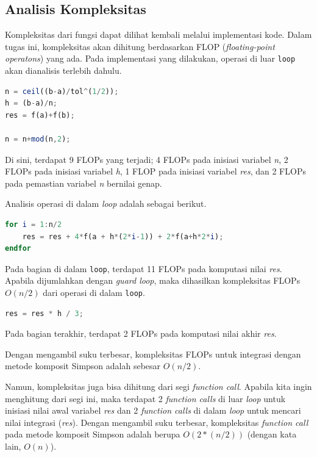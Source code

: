 \documentclass[journal,12pt,onecolumn,a4paper]{IEEEtran}
\begin{document}
\subsection{Analisis Kompleksitas}
Kompleksitas dari fungsi dapat dilihat kembali melalui implementasi kode. Dalam tugas ini, kompleksitas akan dihitung berdasarkan FLOP (\emph{floating-point operatons}) yang ada.
Pada implementasi yang dilakukan, operasi di luar \lstinline{loop} akan dianalisis terlebih dahulu.
\begin{center}
	\begin{lstlisting}[language=Octave]
n = ceil((b-a)/tol^(1/2));
h = (b-a)/n;
res = f(a)+f(b);
	  
n = n+mod(n,2);
	\end{lstlisting}
\end{center}

Di sini, terdapat 9 FLOPs yang terjadi; 4 FLOPs pada inisiasi variabel \emph{n}, 2 FLOPs pada inisiasi variabel \emph{h}, 1 FLOP pada inisiasi variabel \emph{res}, dan 2 FLOPs pada pemastian variabel \emph{n} bernilai genap.

Analisis operasi di dalam \emph{loop} adalah sebagai berikut.
\begin{center}
	\begin{lstlisting}[language=Octave]
for i = 1:n/2
	res = res + 4*f(a + h*(2*i-1)) + 2*f(a+h*2*i);
endfor
	\end{lstlisting}
\end{center}

\par Pada bagian di dalam \lstinline{loop}, terdapat 11 FLOPs pada komputasi nilai \emph{res}. Apabila dijumlahkan dengan \emph{guard loop}, maka dihasilkan kompleksitas FLOPs \(O(n/2)\) dari operasi di dalam \lstinline{loop}.

\begin{center}
	\begin{lstlisting}[language=Octave]
res = res * h / 3;
	\end{lstlisting}
\end{center}

Pada bagian terakhir, terdapat 2 FLOPs pada komputasi nilai akhir \emph{res}.

Dengan mengambil suku terbesar, kompleksitas FLOPs untuk integrasi dengan metode komposit Simpson adalah sebesar \(O(n/2)\).


Namun, kompleksitas juga bisa dihitung dari segi \emph{function call}. Apabila kita ingin menghitung dari segi ini, maka terdapat 2 \emph{function calls} di luar \emph{loop} untuk inisiasi nilai awal variabel \emph{res} dan 2 \emph{function calls} di dalam \emph{loop} untuk mencari nilai integrasi (\emph{res}). Dengan mengambil suku terbesar, kompleksitas \emph{function call} pada metode komposit Simpson adalah berupa \(O(2*(n/2))\) (dengan kata lain, \(O(n)\)).
\end{document}
